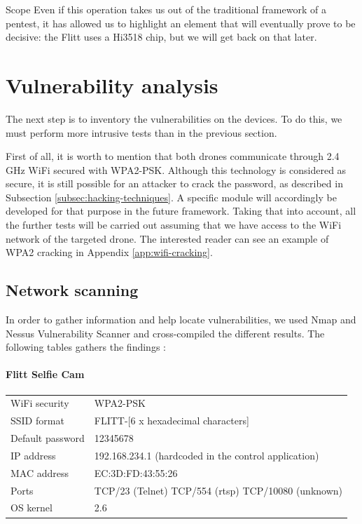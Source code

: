 \begin{chaptercover}{Scope}
Even if this operation takes us out of the traditional framework of a pentest, it has allowed us to highlight an element that will eventually prove to be decisive: the Flitt uses a Hi3518 chip, but we will get back on that later.

\section{Vulnerability analysis}

The next step is to inventory the vulnerabilities on the devices. To do this, we must perform more intrusive tests than in the previous section.

\begin{tip}
First of all, it is worth to mention that both drones communicate through 2.4 GHz WiFi secured with WPA2-PSK. Although this technology is considered as secure, it is still possible for an attacker to crack the password, as described in Subsection \ref{subsec:hacking-techniques}. A specific module will accordingly be developed for that purpose in the future framework. Taking that into account, all the further tests will be carried out assuming that we have access to the WiFi network of the targeted drone. The interested reader can see an example of WPA2 cracking in Appendix \ref{app:wifi-cracking}.
\end{tip}

\subsection{Network scanning}

In order to gather information and help locate vulnerabilities, we used Nmap and Nessus Vulnerability Scanner and cross-compiled the different results. The following tables gathers the findings :

\paragraph{Flitt Selfie Cam}

\begingroup
\renewcommand*{\arraystretch}{1.3}
\begin{center}
\begin{tabular}{L{4cm}L{10cm}}
  WiFi security & WPA2-PSK \\
  SSID format & FLITT-[6 x hexadecimal characters] \\
  Default password & 12345678 \\
  IP address & 192.168.234.1 (hardcoded in the control application) \\
  MAC address & EC:3D:FD:43:55:26 \\
  Ports & TCP/23 (Telnet) \newline TCP/554 (\acrshort{rtsp}) \newline TCP/10080 (unknown) \\
  OS kernel & 2.6 \\
\end{tabular}
\end{center}
\endgroup


\end{chaptercover}
